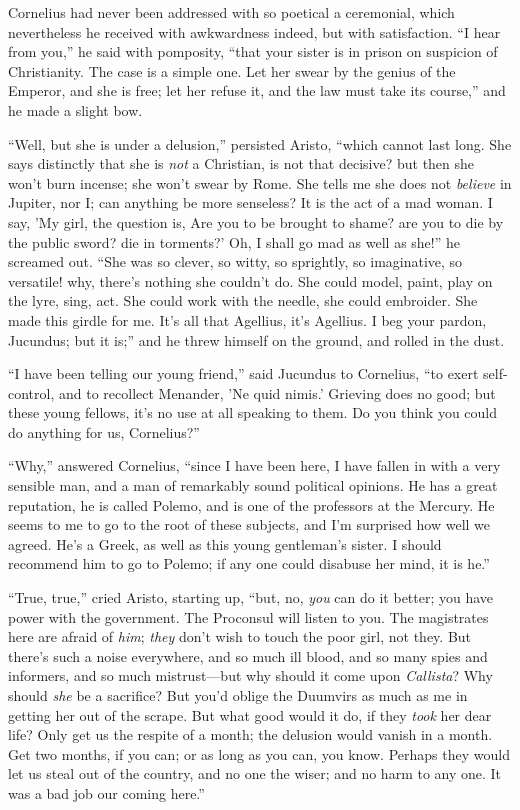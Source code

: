Cornelius had never been addressed with so poetical a ceremonial,
which nevertheless he received with awkwardness indeed, but with
satisfaction. ``I hear from you,'' he said with pomposity,
``that your sister is in prison on suspicion of Christianity. The
case is a simple one. Let her swear by the genius of the Emperor, and
she is free; let her refuse it, and the law must take its
course,'' and he made a slight bow.

``Well, but she is under a delusion,'' persisted Aristo,
``which cannot last long. She says distinctly that she is \emph{not}
a Christian, is not that decisive? but then she won't burn incense;
she won't swear by Rome. She tells me she does not \emph{believe} in
Jupiter, nor I; can anything be more senseless? It is the act of a mad
woman. I say, 'My girl, the question is, Are you to be brought to
shame? are you to die by the public sword? die in torments?' Oh, I
shall go mad as well as she!'' he screamed out. ``She was so
clever, so witty, so sprightly, so imaginative, so versatile! why,
there's nothing she couldn't do. She could model, paint, play on the
lyre, sing, act. She could work with the needle, she could embroider.
She made this girdle for me. It's all that Agellius, it's Agellius. I
beg your pardon, Jucundus; but it is;'' and he threw himself on
the ground, and rolled in the dust.

``I have been telling our young friend,'' said Jucundus to
Cornelius, ``to exert self-control, and to recollect Menander, 'Ne
quid nimis.' Grieving does no good; but these young fellows, it's no
use at all speaking to them. Do you think you could do anything for
us, Cornelius?''

``Why,'' answered Cornelius, ``since I have been here,
I have fallen in with a very sensible man, and a man of remarkably
sound political opinions. He has a great reputation, he is called
Polemo, and is one of the professors at the Mercury. He seems to me to
go to the root of these subjects, and I'm surprised how well we
agreed. He's a Greek, as well as this young gentleman's sister. I
should recommend him to go to Polemo; if any one could disabuse
her mind, it is he.''

``True, true,'' cried Aristo, starting up, ``but, no, \emph{you}
can do it better; you have power with the government. The Proconsul
will listen to you. The magistrates here are afraid of \emph{him}; \emph{they}
don't wish to touch the poor girl, not they. But there's such a noise
everywhere, and so much ill blood, and so many spies and informers,
and so much mistrust—but why should it come upon \emph{Callista}?
Why should \emph{she} be a sacrifice? But you'd oblige the Duumvirs as
much as me in getting her out of the scrape. But what good would it
do, if they \emph{took} her dear life? Only get us the respite of a
month; the delusion would vanish in a month. Get two months, if you
can; or as long as you can, you know. Perhaps they would let us steal
out of the country, and no one the wiser; and no harm to any one. It
was a bad job our coming here.''


